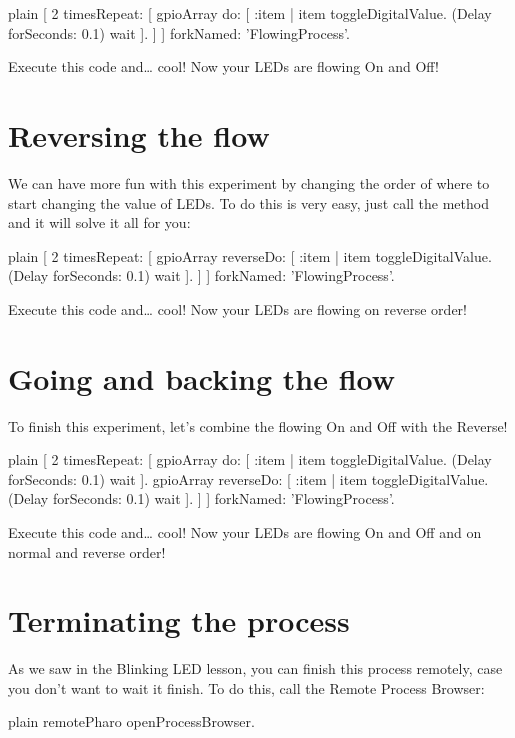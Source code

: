 \documentclass[10pt,twoside,english]{_support/latex/sbabook/sbabook}
\begin{document}
\begin{displaycode}{plain}
[ 2 timesRepeat: [
    gpioArray do: [ :item | item toggleDigitalValue. (Delay forSeconds: 0.1) wait ].
] ] forkNamed: 'FlowingProcess'.
\end{displaycode}

Execute this code and… cool! Now your LEDs are flowing On and Off!
\section{Reversing the flow}
We can have more fun with this experiment by changing the order of where to start changing the value of LEDs. To do this is very easy, just call the method  and it will solve it all for you:

\begin{displaycode}{plain}
[ 2 timesRepeat: [
    gpioArray reverseDo: [ :item | item toggleDigitalValue. (Delay forSeconds: 0.1) wait ].
] ] forkNamed: 'FlowingProcess'.
\end{displaycode}

Execute this code and… cool! Now your LEDs are flowing on reverse order!
\section{Going and backing the flow}
To finish this experiment, let’s combine the flowing On and Off with the Reverse!

\begin{displaycode}{plain}
[ 2 timesRepeat: [
    gpioArray do: [ :item | item toggleDigitalValue. (Delay forSeconds: 0.1) wait ].
    gpioArray reverseDo: [ :item | item toggleDigitalValue. (Delay forSeconds: 0.1) wait ].
] ] forkNamed: 'FlowingProcess'.
\end{displaycode}

Execute this code and… cool! Now your LEDs are flowing On and Off and on normal and reverse order!
\section{Terminating the process}
As we saw in the Blinking LED lesson, you can finish this process remotely, case you don’t want to wait it finish. To do this, call the Remote Process Browser:

\begin{displaycode}{plain}
remotePharo openProcessBrowser.
\end{displaycode}
\end{document}
